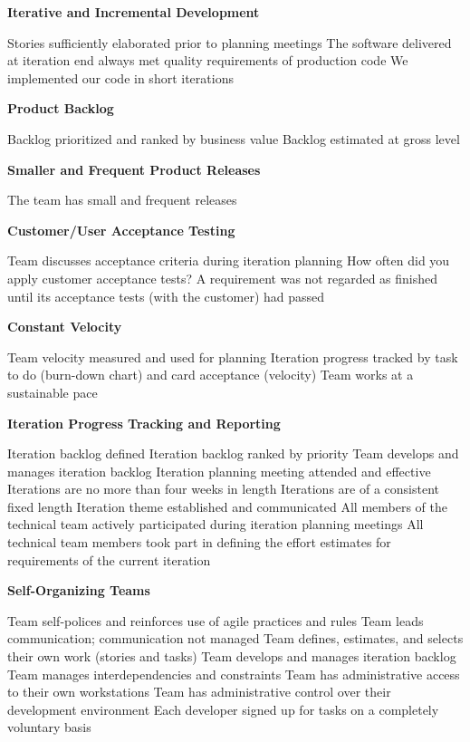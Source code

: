 \vspace{0.5cm}

\textbf{Iterative and Incremental Development}
\begin{itemize}
	\taa Stories sufficiently elaborated prior to planning meetings
	\pam The software delivered at iteration end always met quality requirements of production code 
	\pam We implemented our code in short iterations
\end{itemize}

\textbf{Product Backlog}
\begin{itemize}
	\taa Backlog prioritized and ranked by business value
	\taa Backlog estimated at gross level
\end{itemize}

\textbf{Smaller and Frequent Product Releases}
\begin{itemize}
	\taa The team has small and frequent releases
\end{itemize}

\textbf{Customer/User Acceptance Testing}
\begin{itemize}
	\taa Team discusses acceptance criteria during iteration planning
	\pam How often did you apply customer acceptance tests?
	\pam A requirement was not regarded as finished until its acceptance tests (with the customer) had passed 
\end{itemize}

\textbf{Constant Velocity}
\begin{itemize}
	\taa Team velocity measured and used for planning
	\taa Iteration progress tracked by task to do (burn-down chart) and card acceptance (velocity)
	\taa Team works at a sustainable pace 
\end{itemize}

\textbf{Iteration Progress Tracking and Reporting}
\begin{itemize}
	\taa Iteration backlog defined
	\taa Iteration backlog ranked by priority
	\taa Team develops and manages iteration backlog
	\taa Iteration planning meeting attended and effective
	\taa Iterations are no more than four weeks in length
	\taa Iterations are of a consistent fixed length
	\taa Iteration theme established and communicated 
	\pam All members of the technical team actively participated during iteration planning meetings
	\pam All technical team members took part in defining the effort estimates for 
requirements of the current iteration
\end{itemize}

\textbf{Self-Organizing Teams}
\begin{itemize}
	\taa Team self-polices and reinforces use of agile practices and rules
	\taa Team leads communication; communication not managed
	\taa Team defines, estimates, and selects their own work (stories and tasks)
	\taa Team develops and manages iteration backlog
	\taa Team manages interdependencies and constraints
	\taa Team has administrative access to their own workstations 
	\taa Team has administrative control over their development environment
	\pam Each developer signed up for tasks on a completely voluntary basis
\end{itemize}

